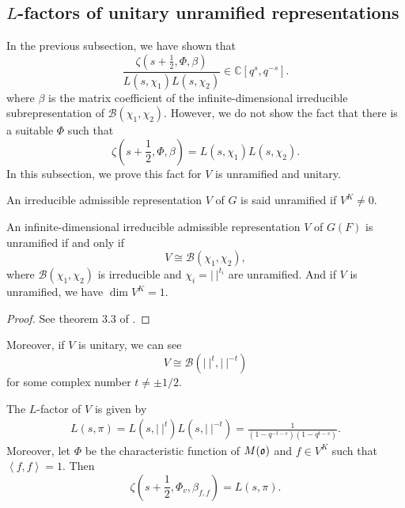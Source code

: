 \subsection{\texorpdfstring{$L$}{L}-factors of unitary unramified representations}

In the previous subsection, we have shown that 
\[
\frac {\zeta (s+\frac 1 2,\Phi, \beta )} {L(s,\chi_1) L(s,\chi_2) }\in \mathbb C[q^s,q^{-s}]. 
\]
where $\beta$ is the matrix coefficient of the infinite-dimensional irreducible subrepresentation of $\mathcal B(\chi_1,\chi_2)$. However, we do not show the fact that there is a suitable $\Phi$ such that 
\[
{\zeta (s+\frac 1 2,\Phi, \beta )} ={L(s,\chi_1) L(s,\chi_2) }.
\]
In this subsection, we prove this fact for $V$ is unramified and unitary.

\begin{definition}
An irreducible admissible representation $V$ of $G$ is said unramified if $V^K\ne 0$. 
\end{definition} 

\begin{lemma}
An infinite-dimensional irreducible admissible representation $V$ of $G(F)$ is unramified if and only if
\[
V\cong \mathcal B(\chi_1,\chi_2),
\]
where $\mathcal B(\chi_1,\chi_2)$ is irreducible and $\chi_i=\left | \ \right |^{t_i}$ are unramified. And if $V$ is unramified, we have $\operatorname {dim} V^K=1$.
\end{lemma}

\begin{proof}
See theorem 3.3 of .
\end{proof}

Moreover, if $V$ is unitary, we can see 
\[
V\cong \mathcal B(\left | \ \right |^t, \left |  \ \right |^{-t})
\]
for some complex number $t\ne \pm 1/2$.

\begin{proposition}\label{6.3.1}
The $L$-factor of $V$ is given by 
\begin{equation*}
	\begin{split}
	L(s,\pi)=L(s,\left| \ \right |^t)L(s,\left | \ \right |^{-t})=\frac 1 {(1-q^{-t-s}  )(1-q^{t-s})}.
\end{split}
\end{equation*}
Moreover, let $\Phi$ be the characteristic function of $M(\mathfrak o)$ and $f\in V^K$ such that $\left\langle  f, f \right \rangle =1$. Then \begin{equation*}
\zeta (s+\frac 1 2 ,\Phi_v,\beta_{f,f})=L(s,\pi).
\end{equation*}
\end{proposition}

